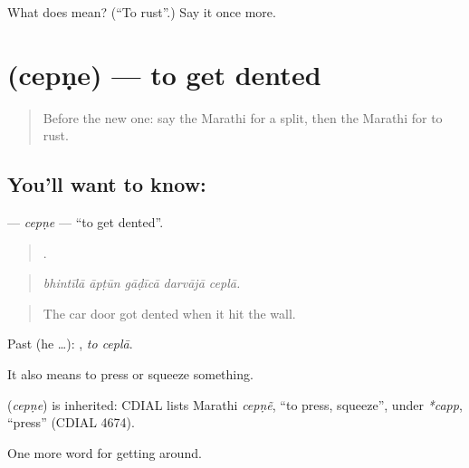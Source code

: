 \begin{tcolorbox}[breakable,colback=teal!4,colframe=teal!35!black,title={Before you move on}]
What does  mean? (\textquotedblleft{}To rust\textquotedblright{}.) Say it once more.
\end{tcolorbox}
\section[\texorpdfstring{\mr{चेपणे} (cepṇe)}{चेपणे (cepṇe)}]{ (cepṇe) — to get dented}

\label{lesson:MR-C433-cepne}



\begin{quote}
Before the new one: say the Marathi for a split, then the Marathi for to rust.
\end{quote}

\subsection*{You'll want to know: }
\textbf{} — \emph{cepṇe} — \textquotedblleft{}to get dented\textquotedblright{}.

\begin{quote}
    .
\end{quote}

\begin{quote}
\emph{bhintīlā āpṭūn gāḍīcā darvājā ceplā.}
\end{quote}

\begin{quote}
The car door got dented when it hit the wall.
\end{quote}

Past (he …):  , \emph{to ceplā}.

It also means to press or squeeze something.

\begin{cousinweb}
\textbf{} (\emph{cepṇe}) is inherited: CDIAL lists Marathi \emph{cepṇẽ}, \textquotedblleft{}to press, squeeze\textquotedblright{}, under \emph{*capp}, \textquotedblleft{}press\textquotedblright{} (CDIAL 4674).
\end{cousinweb}

\begin{grammarlens}[title={What you've built}]
One more word for getting around.
\end{grammarlens}

